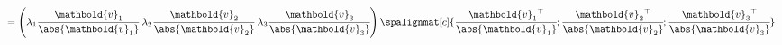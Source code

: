 \begin{enumerate}[(1)]
\begin{align*}
			& = \left(
				\lambda_1\cfrac{\mathbold{v}_1}{\abs{\mathbold{v}_1}}\;
				\lambda_2\cfrac{\mathbold{v}_2}{\abs{\mathbold{v}_2}}\;
				\lambda_3\cfrac{\mathbold{v}_3}{\abs{\mathbold{v}_3}}
			\right)
			\spalignmat[c]{
			{\cfrac{\mathbold{v}_1{}^{\top}}{\abs{\mathbold{v}_1}}};
			{\cfrac{\mathbold{v}_2{}^{\top}}{\abs{\mathbold{v}_2}}};
			{\cfrac{\mathbold{v}_3{}^{\top}}{\abs{\mathbold{v}_3}}}
			}\\

\end{align*}
\end{enumerate}
